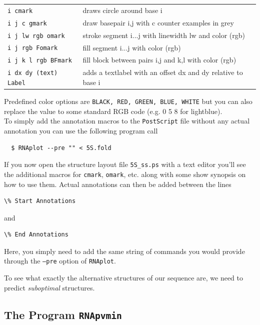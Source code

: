 \documentclass[a4paper]{article}
\begin{document}
\begin{tabular}{ll}
	\texttt{i cmark} & draws circle around base i\\
	\texttt{i j c gmark} & draw basepair i,j with c counter examples in grey\\
	\texttt{i j lw rgb omark} & stroke segment i...j with linewidth lw and color (rgb)\\
	\texttt{i j rgb Fomark} & fill segment i...j with color (rgb)\\
	\texttt{i j k l rgb BFmark} & fill block between pairs i,j and k,l with color (rgb)\\
	\texttt{i dx dy (text) Label} & adds a textlabel with an offset dx and dy relative to base i\\
\end{tabular}

Predefined color options are \texttt{BLACK, RED, GREEN, BLUE, WHITE} but you can also 
replace the value to some standard RGB code (e.g. 0 5 8 for lightblue).\\

To simply add the annotation macros to the \texttt{PostScript} file without
any actual annotation you can use the following program call
\begin{verbatim}
  $ RNAplot --pre "" < 5S.fold
\end{verbatim}

If you now open the structure layout file \texttt{5S\_ss.ps} with a text editor
you'll see the additional macros for \texttt{cmark}, \texttt{omark}, etc.
along with some show synopsis on how to use them. Actual annotations can then be added
between the lines
\begin{verbatim}
\% Start Annotations
\end{verbatim}
and
\begin{verbatim}
\% End Annotations
\end{verbatim}
Here, you simply need to add the same string of commands you would provide through the
\texttt{--pre} option of \texttt{RNAplot}.


To see what exactly the alternative structures of our sequence are, we need
to predict \emph{suboptimal} structures.


\pagebreak[3]
\subsection{The Program \texttt{RNApvmin}}
\end{document}
